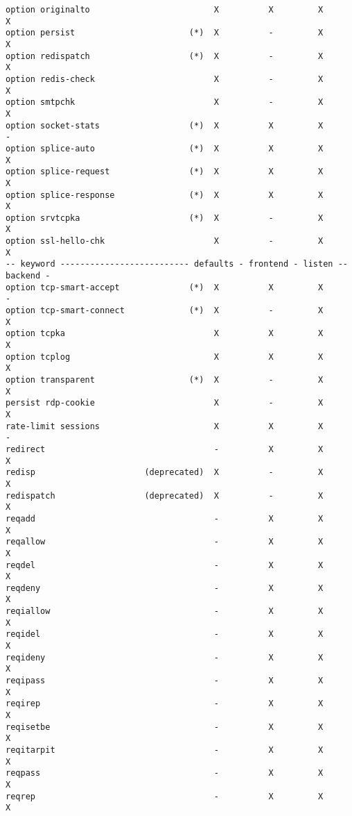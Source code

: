 \begin{verbatim}
option originalto                         X          X         X         X
option persist                       (*)  X          -         X         X
option redispatch                    (*)  X          -         X         X
option redis-check                        X          -         X         X
option smtpchk                            X          -         X         X
option socket-stats                  (*)  X          X         X         -
option splice-auto                   (*)  X          X         X         X
option splice-request                (*)  X          X         X         X
option splice-response               (*)  X          X         X         X
option srvtcpka                      (*)  X          -         X         X
option ssl-hello-chk                      X          -         X         X
-- keyword -------------------------- defaults - frontend - listen -- backend -
option tcp-smart-accept              (*)  X          X         X         -
option tcp-smart-connect             (*)  X          -         X         X
option tcpka                              X          X         X         X
option tcplog                             X          X         X         X
option transparent                   (*)  X          -         X         X
persist rdp-cookie                        X          -         X         X
rate-limit sessions                       X          X         X         -
redirect                                  -          X         X         X
redisp                      (deprecated)  X          -         X         X
redispatch                  (deprecated)  X          -         X         X
reqadd                                    -          X         X         X
reqallow                                  -          X         X         X
reqdel                                    -          X         X         X
reqdeny                                   -          X         X         X
reqiallow                                 -          X         X         X
reqidel                                   -          X         X         X
reqideny                                  -          X         X         X
reqipass                                  -          X         X         X
reqirep                                   -          X         X         X
reqisetbe                                 -          X         X         X
reqitarpit                                -          X         X         X
reqpass                                   -          X         X         X
reqrep                                    -          X         X         X

\end{verbatim}

